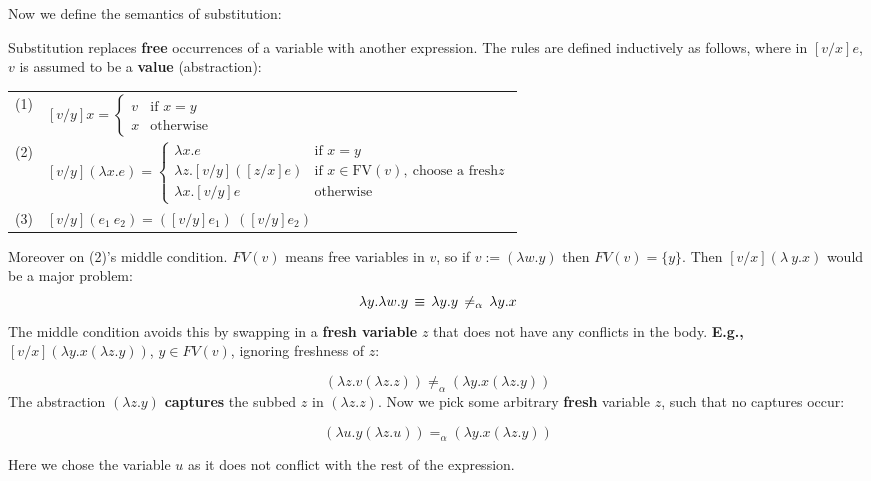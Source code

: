 \noindent
Now we define the semantics of substitution:
\begin{Def}

    \label{def:substitution}
    
    Substitution replaces \textbf{free} occurrences of a variable with another expression. The rules are defined inductively as follows, where in $[v/x]e$, $v$ is assumed to be a \textbf{value} (abstraction):
    
    \begin{center}
        \begin{tabular}{@{}l@{\quad}l@{}}
        (1) & \hspace{2em}
        $[v/y]x = 
        \begin{cases}
        v & \text{if } x = y \\
        x & \text{otherwise}
        \end{cases}$ \\[1em]
        
        (2) & \hspace{0em}
        $[v/y](\lambda x. e) = 
        \begin{cases}
        \lambda x. e & \text{if } x = y \\
        \lambda z. [v/y]([z/x]e) & \text{if } x \in \text{FV}(v),\ \text{choose a fresh} z \\
        \lambda x. [v/y]e & \text{otherwise}
        \end{cases}$ \\[1em]
        
        (3) & \hspace{-.2em}
        $[v/y](e_1\ e_2) = ([v/y]e_1)\ ([v/y]e_2)$
        \end{tabular}
    \end{center}
    
    \noindent
    Moreover on (2)'s middle condition.
    $FV(v)$ means free variables in $v$,
    so if $v:=(\lambda w.y)$ then $FV(v)=\{y\}$.
    Then $[v/x](\lambda\ y.x)$ would be a major problem:
    \LARGE
    $$\Large \lambda y.\lambda w.y \,\equiv \, \lambda y.y \,\neq_\alpha\, \lambda y.x$$
    \normalsize
    The middle condition avoids
    this by swapping in a \textbf{fresh variable} $z$ that does not have any
    conflicts in the body. \textbf{E.g.,} $[v/x](\lambda y.x(\lambda z.y)) $, $y\in FV(v)$, ignoring freshness of $z$:
    
    \vspace{-1em}
    \LARGE
    $$ (\lambda z.v(\lambda z.z)) \neq_\alpha (\lambda y.x(\lambda z.y))$$
    \normalsize
    The abstraction $(\lambda z.y)$ \textbf{captures} the subbed $z$ in $(\lambda z.z)$. Now we pick some arbitrary \textbf{fresh} variable $z$, such 
    that no captures occur:

    \vspace{-1em}
    \LARGE
    $$ (\lambda u.y(\lambda z.u)) =_\alpha (\lambda y.x(\lambda z.y))$$
    \normalsize

    \noindent
    Here we chose the variable $u$ as it does not conflict with the rest of the expression.
\end{Def}
